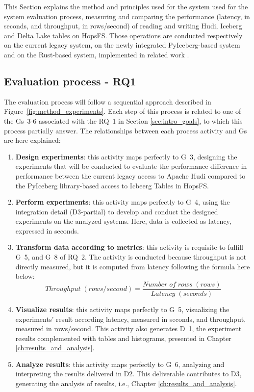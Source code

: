 This Section explains the method and principles used for the system used for the system evaluation process, measuring and comparing the performance (latency, in seconds, and throughput, in rows/second) of reading and writing Hudi, Iceberg and Delta Lake tables on \gls{HopsFS}. Those operations are conducted respectively on the current legacy system, on the newly integrated PyIceberg-based system and on the Rust-based system, implemented in related work \cite{manfrediReducingReadWrite2024}.

\subsection{Evaluation process - RQ1}
\label{subsec:eval_process}
The evaluation process will follow a sequential approach described in Figure~\ref{fig:method_experiments}. Each step of this process is related to one of the \glspl{G}~3-6 associated with the \gls{RQ}~1 in Section \ref{sec:intro_goals}, to which this process partially answer. The relationships between each process activity and \glspl{G} are here explained:
\begin{enumerate}
    \item \textbf{Design experiments}: this activity maps perfectly to \gls{G}~3, designing the experiments that will be conducted to evaluate the performance difference in performance between the current legacy access to Apache Hudi compared to the PyIceberg library-based access to Icbeerg Tables in \gls{HopsFS}. 
    \item \textbf{Perform experiments}: this activity maps perfectly to \gls{G}~4, using the integration detail (\gls{D}3-partial) to develop and conduct the designed experiments on the analyzed systems. Here, data is collected as latency, expressed in seconds.
    \item \textbf{Transform data according to metrics}: this activity is requisite to fulfill \gls{G}~5, and \gls{G}~8 of \gls{RQ}~2. The activity is conducted because throughput is not directly measured, but it is computed from latency following the formula here below:
    \[ Throughput \; (rows/second) = \frac{Number \; of \; rows \; (rows)}{Latency \;(seconds)}\]
    \item \textbf{Visualize results}: this activity maps perfectly to \gls{G}~5, visualizing the experiments' result according latency, measured in seconds, and throughput, measured in rows/second. This activity also generates \gls{D}~1, the experiment results complemented with tables and histograms, presented in Chapter \ref{ch:results_and_analysis}.
    \item \textbf{Analyze results}: this activity maps perfectly to \gls{G}~6, analyzing and interpreting the results delivered in D2. This deliverable contributes to D3, generating the analysis of results, i.e., Chapter \ref{ch:results_and_analysis}.
\end{enumerate}
